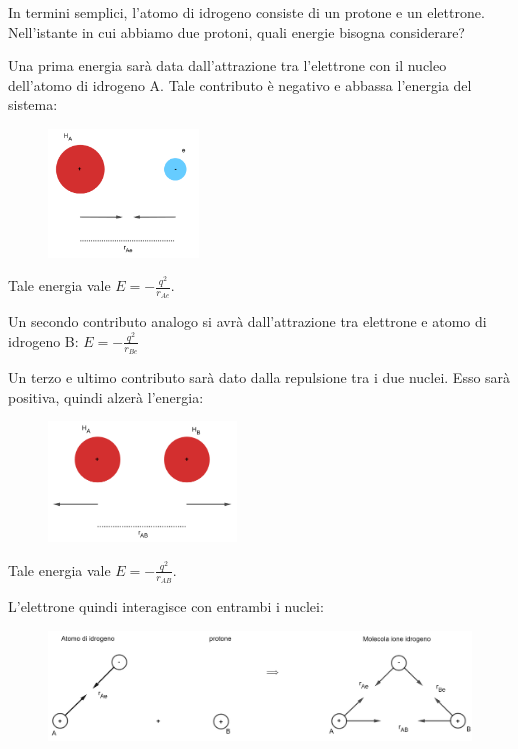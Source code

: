 In termini semplici, l'atomo di idrogeno consiste di un protone e un elettrone. Nell'istante in cui abbiamo due protoni, quali energie bisogna considerare?

Una prima energia sarà data dall'attrazione tra l'elettrone con il nucleo dell'atomo di idrogeno A. Tale contributo è negativo e abbassa l'energia del sistema:

\begin{figure}[htp]
    \centering
    \includegraphics[width=4cm]{immagini/attrazione protone-elettrone.png}
\end{figure}

Tale energia vale $E=\displaystyle-\frac{q^2}{r_{Ae}}$.

Un secondo contributo analogo si avrà dall'attrazione tra elettrone e atomo di idrogeno B: $E=\displaystyle-\frac{q^2}{r_{Be}}$

\vspace{0.2cm}Un terzo e ultimo contributo sarà dato dalla repulsione tra i due nuclei. Esso sarà positiva, quindi alzerà l'energia:
\begin{figure}[htp]
    \centering
    \includegraphics[width=5cm]{immagini/repulsione protone-protone.png}
\end{figure}

Tale energia vale $E=\displaystyle-\frac{q^2}{r_{AB}}$.

\vspace{0.2cm}L'elettrone quindi interagisce con entrambi i nuclei:
\begin{figure}[htp]
    \centering
    \includegraphics[width=14cm]{immagini/interazione_elettrone_con_protoni.png}
\end{figure}

